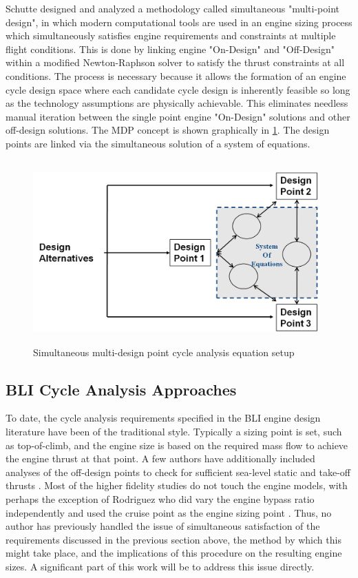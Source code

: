 \documentclass[12pt]{gatech-thesis}
\begin{document}
\indent Schutte \cite{SchutteThesis} designed and analyzed a methodology called simultaneous "multi-point design", in which modern computational tools are used in an engine sizing process which simultaneously satisfies engine requirements and constraints at multiple flight conditions.  This is done by linking engine "On-Design" and "Off-Design" within a modified Newton-Raphson solver to satisfy the thrust constraints at all conditions.  The process is necessary because it allows the formation of an engine cycle design space where each candidate cycle design is inherently feasible so long as the technology assumptions are physically achievable.  This eliminates needless manual iteration between the single point engine "On-Design" solutions and other off-design solutions.  The MDP concept is shown graphically in \ref{MDP_System_of_Equations}.  The design points are linked via the simultaneous solution of a system of equations.

	\begin{figure}[htpb]
	\centering
	\includegraphics[width=110mm, height =70mm, clip=true, trim = 0mm 0mm 0mm 0mm]{MDP_System_of_Equations.png}
	\caption{Simultaneous multi-design point cycle analysis equation setup \cite{SchutteThesis}}
	\label{MDP_System_of_Equations}
	\end{figure}

\subsection{BLI Cycle Analysis Approaches}
\indent To date, the cycle analysis requirements specified in the BLI engine design literature have been of the traditional style.  Typically a sizing point is set, such as top-of-climb, and the engine size is based on the required mass flow to achieve the engine thrust at that point.  A few authors have additionally included analyses of the off-design points to check for sufficient sea-level static and take-off thrusts \cite{Felder2011} \cite{Sato2011}.  Most of the higher fidelity studies do not touch the engine models, with perhaps the exception of Rodriguez who did vary the engine bypass ratio independently and used the cruise point as the engine sizing point \cite{RodriguezThesis} \cite{Rodriguez2009}.  Thus, no author has previously handled the issue of simultaneous satisfaction of the requirements discussed in the previous section above, the method by which this might take place, and the implications of this procedure on the resulting engine sizes.  A significant part of this work will be to address this issue directly.
\end{document}

